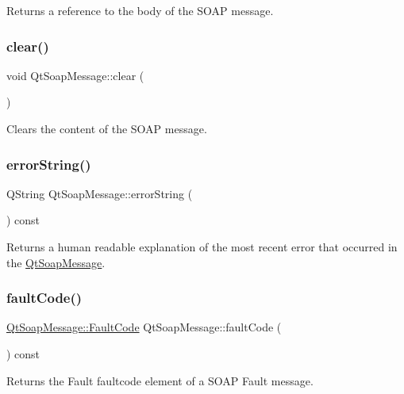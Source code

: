Returns a reference to the body of the S\+O\+AP message. \mbox{\label{class_qt_soap_message_aba7b362184f4d75405a237014d46cad6}} 
\subsubsection{\texorpdfstring{clear()}{clear()}}
{\footnotesize\ttfamily void Qt\+Soap\+Message\+::clear (\begin{DoxyParamCaption}{ }\end{DoxyParamCaption})}

Clears the content of the S\+O\+AP message. \mbox{\label{class_qt_soap_message_a3ae2c2925bc7843e32d57dce0c318d41}} 
\subsubsection{\texorpdfstring{error\+String()}{errorString()}}
{\footnotesize\ttfamily Q\+String Qt\+Soap\+Message\+::error\+String (\begin{DoxyParamCaption}{ }\end{DoxyParamCaption}) const}

Returns a human readable explanation of the most recent error that occurred in the \mbox{\hyperlink{class_qt_soap_message}{Qt\+Soap\+Message}}. \mbox{\label{class_qt_soap_message_a2f5bbde1c34bddebd81ba112087c78c3}} 
\subsubsection{\texorpdfstring{fault\+Code()}{faultCode()}}
{\footnotesize\ttfamily \mbox{\hyperlink{class_qt_soap_message_ad27765646a4612b1f644229e9544b744}{Qt\+Soap\+Message\+::\+Fault\+Code}} Qt\+Soap\+Message\+::fault\+Code (\begin{DoxyParamCaption}{ }\end{DoxyParamCaption}) const}

Returns the Fault faultcode element of a S\+O\+AP Fault message. \mbox{\label{class_qt_soap_message_a6263ac6f8823f9e2a00e83ba2bf5c4dd}} 
